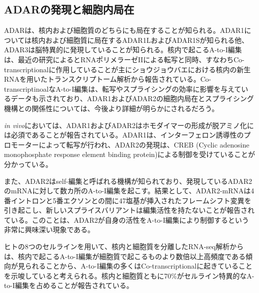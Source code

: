 \subsection{ADARの発現と細胞内局在}
ADARは、核内および細胞質のどちらにも局在することが知られる。ADAR1については核内および細胞質に局在するADAR1LおよびADAR1Sが知られる他、ADAR3は脳特異的に発現していることが知られる。核内で起こるA-to-I編集は、最近の研究によるとRNAポリメラーゼIIによる転写と同時、すなわちCo-transcriptionalに作用していることが主にショウジョウバエにおける核内の新生RNAを用いたトランスクリプトーム解析から報告されている。Co-transcriptinoalなA-to-I編集は、転写やスプライシングの効率に影響を与えているデータも示されており、ADAR1およびADAR2の細胞内局在とスプライシング機構との関係性については、今後より詳細が明らかにされるだろう。
\par
\textit{in vivo}においては、ADAR1およびADAR2はホモダイマーの形成が脱アミノ化には必須であることが報告されている。ADAR1は、インターフェロン誘導性のプロモーターによって転写が行われ、ADAR2の発現は、CREB (Cyclic adenosine monophosphate response element binding protein)による制御を受けていることが分かっている。
\par
また、ADAR2はself-編集と呼ばれる機構が知られており、発現しているADAR2のmRNAに対して数カ所のA-to-I編集を起こす。結果として、ADAR2-mRNAは4番イントロンと5番エクソンとの間に47塩基が挿入されたフレームシフト変異を引き起こし、新しいスプライスバリアントは編集活性を持たないことが報告されている。このことは、ADAR2が自身の活性をA-to-I編集により制御するという非常に興味深い現象である。
\par
ヒトの8つのセルラインを用いて、核内と細胞質を分離したRNA-seq解析からは、核内で起こるA-to-I編集が細胞質で起こるものより数倍以上高頻度である傾向が見られることから、A-to-I編集の多くはCo-transcriptionalに起きていることを示唆していると考えられる。核内と細胞質ともに70\%がセルライン特異的なA-to-I編集を占めることが報告されている。

